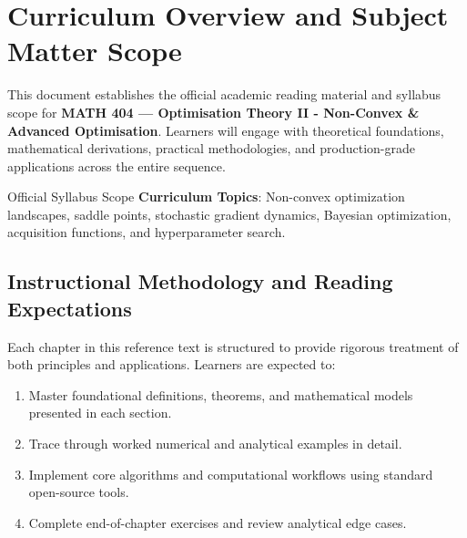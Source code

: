 \section{Curriculum Overview and Subject Matter Scope}

This document establishes the official academic reading material and syllabus scope for \textbf{MATH 404 --- Optimisation Theory II - Non-Convex \& Advanced Optimisation}. Learners will engage with theoretical foundations, mathematical derivations, practical methodologies, and production-grade applications across the entire sequence.

\begin{InsightBox}{Official Syllabus Scope}
  \textbf{Curriculum Topics}: Non-convex optimization landscapes, saddle points, stochastic gradient dynamics, Bayesian optimization, acquisition functions, and hyperparameter search.
\end{InsightBox}

\subsection{Instructional Methodology and Reading Expectations}

Each chapter in this reference text is structured to provide rigorous treatment of both principles and applications. Learners are expected to:
\begin{enumerate}
  \item Master foundational definitions, theorems, and mathematical models presented in each section.
  \item Trace through worked numerical and analytical examples in detail.
  \item Implement core algorithms and computational workflows using standard open-source tools.
  \item Complete end-of-chapter exercises and review analytical edge cases.
\end{enumerate}


